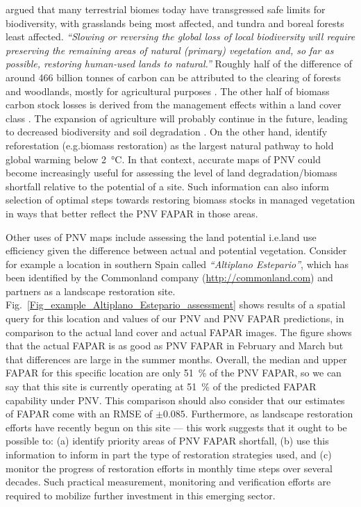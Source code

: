 \documentclass[fleqn,10pt,lineno]{wlpeerj} %
\begin{document}
\citet{newbold2016has} argued that many terrestrial biomes today have transgressed safe limits for biodiversity, with grasslands being most affected, and tundra and boreal forests least affected. \emph{``Slowing or reversing the global loss of local biodiversity will require preserving the remaining areas of natural (primary) vegetation and, so far as possible, restoring human-used lands to natural.''} \citep{newbold2016has} Roughly half of the difference of around 466 billion tonnes of carbon can be attributed to the clearing of forests and woodlands, mostly for agricultural purposes \citep{erb2017unexpectedly}. The other half of biomass carbon stock losses is derived from the management effects within a land cover class \citep{erb2017unexpectedly}. The expansion of agriculture will probably continue in the future, leading to decreased biodiversity and soil degradation \citep{mauser2015global,land6040067}. On the other hand, \citet{Griscom11645} identify reforestation (e.g.\@ biomass restoration) as the largest natural pathway to hold global warming below \SI{2}{\celsius}. In that context, accurate maps of PNV could become increasingly useful for assessing the level of land degradation/biomass shortfall relative to the potential of a site. Such information can also inform selection of optimal steps towards restoring biomass stocks in managed vegetation in ways that better reflect the PNV FAPAR in those areas. \par

Other uses of PNV maps include assessing the land potential i.e.\@ land use efficiency given the difference between actual and potential vegetation. Consider for example a location in southern Spain called \emph{``Altiplano Estepario''}, which has been identified by the Commonland company (\url{http://commonland.com}) and partners as a landscape restoration site. Fig.\@~\ref{Fig_example_Altiplano_Estepario_assessment} shows results of a spatial query for this location and values of our PNV and PNV FAPAR predictions, in comparison to the actual land cover and actual FAPAR images. The figure shows that the actual FAPAR is as good as PNV FAPAR in February and March but that differences are large in the summer months. Overall, the median and upper FAPAR for this specific location are only \SI{51}{\percent} of the PNV FAPAR, so we can say that this site is currently operating at \SI{51}{\percent} of the predicted FAPAR capability under PNV. This comparison should also consider that our estimates of FAPAR come with an RMSE of $\pm 0.085$. Furthermore, as landscape restoration efforts have recently begun on this site --- this work suggests that it ought to be possible to: (a) identify priority areas of PNV FAPAR shortfall, (b) use this information to inform in part the type of restoration strategies used, and (c) monitor the progress of restoration efforts in monthly time steps over several decades. Such practical measurement, monitoring and verification efforts are required to mobilize further investment in this emerging sector. \par
\end{document}
